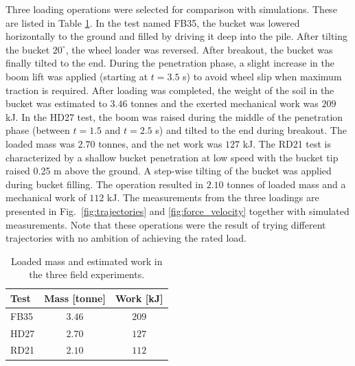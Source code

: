 \documentclass[10pt]{article}
\begin{document}
Three loading operations were selected for comparison with simulations.
These are listed in Table \ref{table:field_test}. In the test named FB35, 
the bucket was lowered horizontally to the ground and filled by 
driving it deep into the pile. After tilting the bucket $20^\circ$, 
the wheel loader was reversed. After breakout, the bucket was finally tilted to the end. 
During the penetration phase, a slight increase in the boom lift was applied (starting at $t = 3.5$ s) 
to avoid wheel slip when maximum traction is required. After loading was completed, the weight of the soil in the bucket was estimated to $3.46$ tonnes and the exerted mechanical work was $209$ kJ. 
In the HD27 test, the boom was raised during the middle of the penetration phase 
(between $t = 1.5$ and $t = 2.5$ s) and tilted to the end during breakout. The 
loaded mass was $2.70$ tonnes, and the net work was $127$ kJ.
The RD21 test is characterized by a shallow bucket penetration at low speed with the
bucket tip raised 0.25 m above the ground. A step-wise tilting of the bucket was applied during
bucket filling. The operation resulted in $2.10$ tonnes of 
loaded mass and a mechanical work of $112$ kJ. 
The measurements from the three loadings are presented in Fig.~\ref{fig:trajectories}
and \ref{fig:force_velocity} together with simulated measurements.
Note that these operations were the result of trying different trajectories with no ambition of achieving the rated load.

\begin{table}[ht] 
  \caption{Loaded mass and estimated work in the three field experiments.}
  \centering
  \begin{tabular}{|l|c|c|}%
  \hline
  Test     & 	Mass [tonne]  & Work [kJ] \\ %
  \hline
  FB35     &   $3.46$   &  $209$ \\%
  HD27     &   $2.70$   &  $127$  \\%
											   
  RD21      &   $2.10$   &  $112$ \\%
  \hline
\end{tabular}
\label{table:field_test}
\end{table}   

\end{document}
